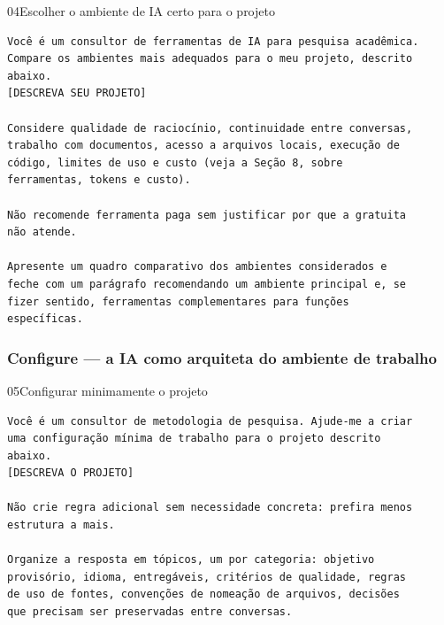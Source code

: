 \documentclass[11pt,a4paper]{article}
\begin{document}
\begin{modelo}{04}{Escolher o ambiente de IA certo para o projeto}
\begin{lstlisting}
Você é um consultor de ferramentas de IA para pesquisa acadêmica.
Compare os ambientes mais adequados para o meu projeto, descrito
abaixo.
[DESCREVA SEU PROJETO]

Considere qualidade de raciocínio, continuidade entre conversas,
trabalho com documentos, acesso a arquivos locais, execução de
código, limites de uso e custo (veja a Seção 8, sobre
ferramentas, tokens e custo).

Não recomende ferramenta paga sem justificar por que a gratuita
não atende.

Apresente um quadro comparativo dos ambientes considerados e
feche com um parágrafo recomendando um ambiente principal e, se
fizer sentido, ferramentas complementares para funções
específicas.
\end{lstlisting}
\end{modelo}

\subsubsection*{Configure --- a IA como arquiteta do ambiente de trabalho}

\begin{modelo}{05}{Configurar minimamente o projeto}
\begin{lstlisting}
Você é um consultor de metodologia de pesquisa. Ajude-me a criar
uma configuração mínima de trabalho para o projeto descrito
abaixo.
[DESCREVA O PROJETO]

Não crie regra adicional sem necessidade concreta: prefira menos
estrutura a mais.

Organize a resposta em tópicos, um por categoria: objetivo
provisório, idioma, entregáveis, critérios de qualidade, regras
de uso de fontes, convenções de nomeação de arquivos, decisões
que precisam ser preservadas entre conversas.
\end{lstlisting}
\end{modelo}
\end{document}
